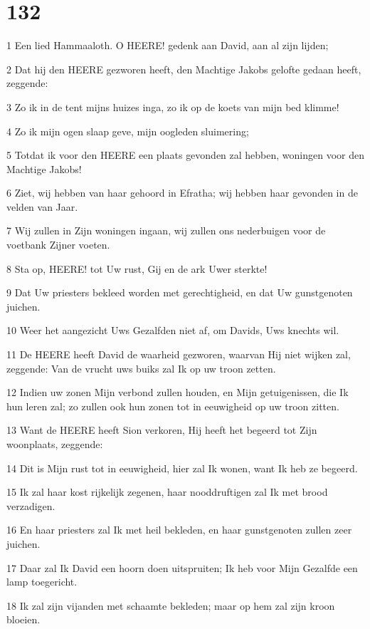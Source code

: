 \chapter{132}

\par 1 Een lied Hammaaloth. O HEERE! gedenk aan David, aan al zijn lijden;
\par 2 Dat hij den HEERE gezworen heeft, den Machtige Jakobs gelofte gedaan heeft, zeggende:
\par 3 Zo ik in de tent mijns huizes inga, zo ik op de koets van mijn bed klimme!
\par 4 Zo ik mijn ogen slaap geve, mijn oogleden sluimering;
\par 5 Totdat ik voor den HEERE een plaats gevonden zal hebben, woningen voor den Machtige Jakobs!
\par 6 Ziet, wij hebben van haar gehoord in Efratha; wij hebben haar gevonden in de velden van Jaar.
\par 7 Wij zullen in Zijn woningen ingaan, wij zullen ons nederbuigen voor de voetbank Zijner voeten.
\par 8 Sta op, HEERE! tot Uw rust, Gij en de ark Uwer sterkte!
\par 9 Dat Uw priesters bekleed worden met gerechtigheid, en dat Uw gunstgenoten juichen.
\par 10 Weer het aangezicht Uws Gezalfden niet af, om Davids, Uws knechts wil.
\par 11 De HEERE heeft David de waarheid gezworen, waarvan Hij niet wijken zal, zeggende: Van de vrucht uws buiks zal Ik op uw troon zetten.
\par 12 Indien uw zonen Mijn verbond zullen houden, en Mijn getuigenissen, die Ik hun leren zal; zo zullen ook hun zonen tot in eeuwigheid op uw troon zitten.
\par 13 Want de HEERE heeft Sion verkoren, Hij heeft het begeerd tot Zijn woonplaats, zeggende:
\par 14 Dit is Mijn rust tot in eeuwigheid, hier zal Ik wonen, want Ik heb ze begeerd.
\par 15 Ik zal haar kost rijkelijk zegenen, haar nooddruftigen zal Ik met brood verzadigen.
\par 16 En haar priesters zal Ik met heil bekleden, en haar gunstgenoten zullen zeer juichen.
\par 17 Daar zal Ik David een hoorn doen uitspruiten; Ik heb voor Mijn Gezalfde een lamp toegericht.
\par 18 Ik zal zijn vijanden met schaamte bekleden; maar op hem zal zijn kroon bloeien.


